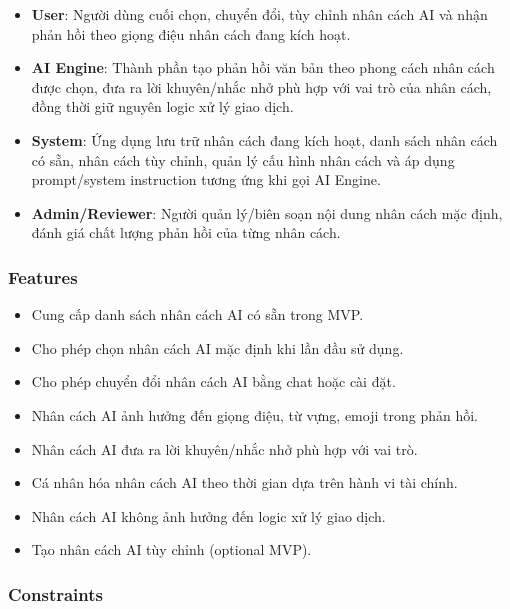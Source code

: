 \begin{itemize}
\item \textbf{User}: Người dùng cuối chọn, chuyển đổi, tùy chỉnh nhân cách AI và nhận phản hồi theo giọng điệu nhân cách đang kích hoạt.
\item \textbf{AI Engine}: Thành phần tạo phản hồi văn bản theo phong cách nhân cách được chọn, đưa ra lời khuyên/nhắc nhở phù hợp với vai trò của nhân cách, đồng thời giữ nguyên logic xử lý giao dịch.
\item \textbf{System}: Ứng dụng lưu trữ nhân cách đang kích hoạt, danh sách nhân cách có sẵn, nhân cách tùy chỉnh, quản lý cấu hình nhân cách và áp dụng prompt/system instruction tương ứng khi gọi AI Engine.
\item \textbf{Admin/Reviewer}: Người quản lý/biên soạn nội dung nhân cách mặc định, đánh giá chất lượng phản hồi của từng nhân cách.
\end{itemize}
\subsubsection{Features}

\begin{itemize}
\item Cung cấp danh sách nhân cách AI có sẵn trong MVP.
\item Cho phép chọn nhân cách AI mặc định khi lần đầu sử dụng.
\item Cho phép chuyển đổi nhân cách AI bằng chat hoặc cài đặt.
\item Nhân cách AI ảnh hưởng đến giọng điệu, từ vựng, emoji trong phản hồi.
\item Nhân cách AI đưa ra lời khuyên/nhắc nhở phù hợp với vai trò.
\item Cá nhân hóa nhân cách AI theo thời gian dựa trên hành vi tài chính.
\item Nhân cách AI không ảnh hưởng đến logic xử lý giao dịch.
\item Tạo nhân cách AI tùy chỉnh (optional MVP).
\end{itemize}
\subsubsection{Constraints}

